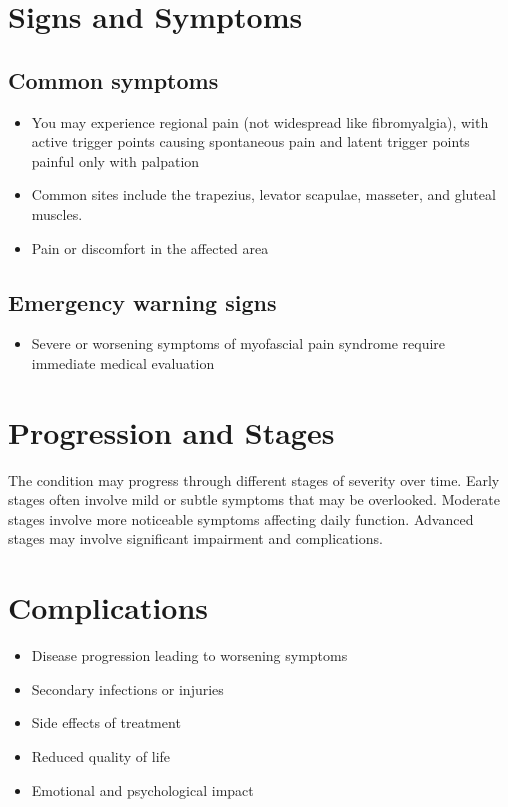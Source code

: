 \section{Signs and Symptoms}

\subsection{Common symptoms}
\begin{itemize}[noitemsep]
  \item You may experience regional pain (not widespread like fibromyalgia), with active trigger points causing spontaneous pain and latent trigger points painful only with palpation
  \item Common sites include the trapezius, levator scapulae, masseter, and gluteal muscles.
  \item Pain or discomfort in the affected area
  \end{itemize}

\subsection{Emergency warning signs}
\begin{itemize}[noitemsep]
  \item Severe or worsening symptoms of myofascial pain syndrome require immediate medical evaluation
\end{itemize}
\section{Progression and Stages}
The condition may progress through different stages of severity over time. Early stages often involve mild or subtle symptoms that may be overlooked. Moderate stages involve more noticeable symptoms affecting daily function. Advanced stages may involve significant impairment and complications.
\section{Complications}
\begin{itemize}[noitemsep]
  \item Disease progression leading to worsening symptoms
  \item Secondary infections or injuries
  \item Side effects of treatment
  \item Reduced quality of life
  \item Emotional and psychological impact
\end{itemize}

